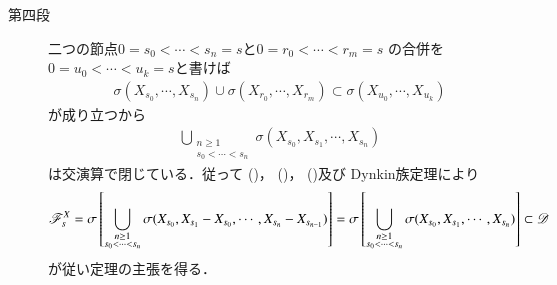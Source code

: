 \begin{prf}
\begin{description}
		\item[第四段]
			二つの節点$0 = s_0 < \cdots < s_n = s$と$0 = r_0 < \cdots < r_m = s$
			の合併を$0 = u_0 < \cdots < u_k = s$と書けば
			\begin{align}
				\sigma(X_{s_0},\cdots,X_{s_n})
				\cup \sigma(X_{r_0},\cdots,X_{r_m})
				\subset \sigma(X_{u_0},\cdots,X_{u_k})
			\end{align}
			が成り立つから
			\begin{align}
				\bigcup_{\substack{n \geq 1 \\ s_0 < \cdots < s_n}} \sigma(X_{s_0},X_{s_1},\cdots,X_{s_n})
			\end{align}
			は交演算で閉じている．従って
			()，
			()，
			()及び
			Dynkin族定理により
			\begin{align}
				\mathscr{F}^X_s 
				= \sigma \left[\bigcup_{\substack{n \geq 1 \\ s_0 < \cdots < s_n}} \sigma(X_{s_0},X_{s_1}-X_{s_0},\cdots,X_{s_n} - X_{s_{n-1}})\right]
				= \sigma \left[\bigcup_{\substack{n \geq 1 \\ s_0 < \cdots < s_n}} \sigma(X_{s_0},X_{s_1},\cdots,X_{s_n})\right]
				\subset \mathscr{D}
			\end{align}
			が従い定理の主張を得る．
			\QED
	\end{description}
\end{prf}